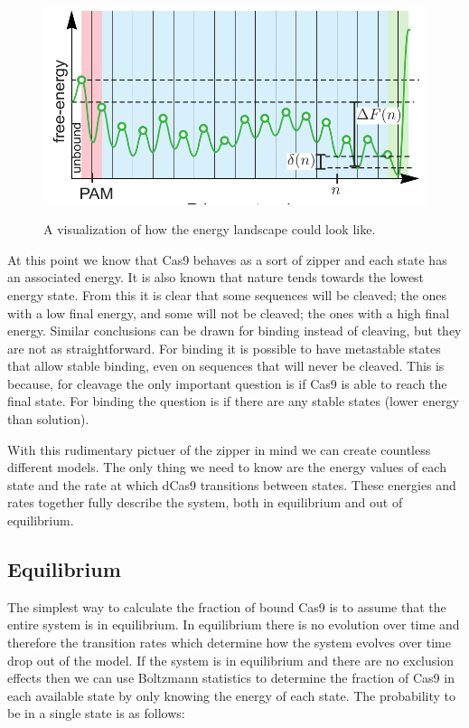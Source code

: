 \begin{figure}[H]
\begin{center}
\includegraphics[width=\textwidth]{images/ENERGYLANDSCAPECARTOON}
\label{fig:energy_landscape_cartoon}
\caption{A visualization of how the energy landscape could look like.}
\end{center}
\end{figure}

At this point we know that Cas9 behaves as a sort of zipper and each state has an associated energy. It is also known that nature tends towards the lowest energy state. From this it is clear that some sequences will be cleaved; the ones with a low final energy, and some will not be cleaved; the ones with a high final energy. Similar conclusions can be drawn for binding instead of cleaving, but they are not as straightforward. For binding it is possible to have metastable states that allow stable binding, even on sequences that will never be cleaved. This is because, for cleavage the only important question is if Cas9 is able to reach the final state. For binding the question is if there are any stable states (lower energy than solution).

With this rudimentary pictuer of the zipper in mind we can create countless different models. The only thing we need to know are the energy values of each state and the rate at which dCas9 transitions between states. These energies and rates together fully describe the system, both in equilibrium and out of equilibrium.

\subsection{Equilibrium}
\label{seq:EquilTheory}

The simplest way to calculate the fraction of bound Cas9 is to assume that the entire system is in equilibrium. In equilibrium there is no evolution over time and therefore the transition rates which determine how the system evolves over time drop out of the model. If the system is in equilibrium and there are no exclusion effects then we can use Boltzmann statistics to determine the fraction of Cas9 in each available state by only knowing the energy of each state. The probability to be in a single state is as follows:

